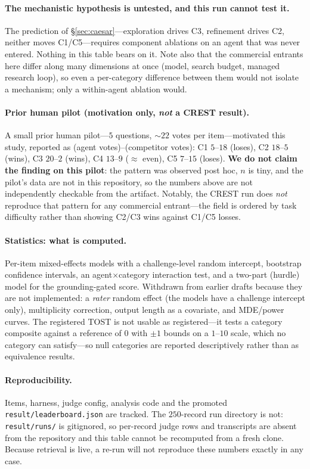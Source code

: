\paragraph{The mechanistic hypothesis is untested, and this run cannot test it.} The prediction of
\S\ref{sec:caesar}---exploration drives C3, refinement drives C2, neither moves C1/C5---requires
component ablations on an agent that was never entered. Nothing in this table bears on it. Note also
that the commercial entrants here differ along many dimensions at once (model, search budget,
managed research loop), so even a per-category difference between them would not isolate a
mechanism; only a within-agent ablation would.

\paragraph{Prior human pilot (motivation only, \emph{not} a CREST result).} A small prior human
pilot---$5$ questions, ${\sim}22$ votes per item---motivated this study, reported as (agent
votes)--(competitor votes): C1 $5$--$18$ (loses), C2 $18$--$5$ (wins), C3 $20$--$2$ (wins), C4
$13$--$9$ ($\approx$ even), C5 $7$--$15$ (loses). \textbf{We do not claim the finding on this
pilot}: the pattern was observed post hoc, $n$ is tiny, and the pilot's data are not in this
repository, so the numbers above are not independently checkable from the artifact. Notably, the
CREST run does \emph{not} reproduce that pattern for any commercial entrant---the field is ordered by
task difficulty rather than showing C2/C3 wins against C1/C5 losses.

\paragraph{Statistics: what is computed.} Per-item mixed-effects models with a challenge-level random
intercept, bootstrap confidence intervals, an agent$\times$category interaction test, and a two-part
(hurdle) model for the grounding-gated score. Withdrawn from earlier drafts because they are not
implemented: a \emph{rater} random effect (the models have a challenge intercept only), multiplicity
correction, output length as a covariate, and MDE/power curves. The registered TOST is not usable as
registered---it tests a category composite against a reference of $0$ with $\pm1$ bounds on a
$1$--$10$ scale, which no category can satisfy---so null categories are reported descriptively
rather than as equivalence results.

\paragraph{Reproducibility.} Items, harness, judge config, analysis code and the promoted
\texttt{result/leaderboard.json} are tracked. The $250$-record run directory is not:
\texttt{result/runs/} is gitignored, so per-record judge rows and transcripts are absent from the
repository and this table cannot be recomputed from a fresh clone. Because retrieval is live, a
re-run will not reproduce these numbers exactly in any case.
